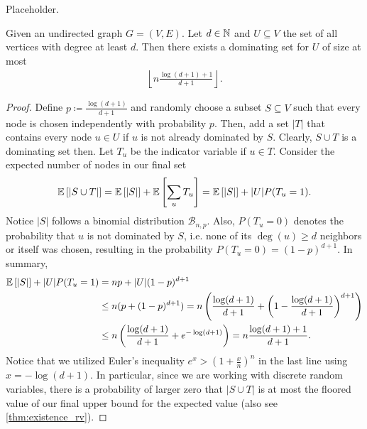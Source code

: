 \begin{aufgabe}
	Placeholder.
\end{aufgabe}
\begin{aufgabe}
	Given an undirected graph $G=(V,E)$.
	Let $d \in \mathbb{N}$ and $U \subseteq V$ the set of all vertices with degree at least $d$.
	Then there exists a dominating set for $U$ of size at most 
	\begin{align*}
		\left\lfloor n \frac{\log(d+1)+1}{d+1} \right\rfloor.
	\end{align*}
	\begin{proof}
		Define $p \coloneqq \frac{\log(d+1)}{d+1}$ and randomly choose a subset $S \subseteq V$
		such that every node is chosen independently with probability $p$.
		Then, add a set $|T|$ that contains every node $u \in U$ if $u$ is not already dominated by $S$.
		Clearly, $S\cup T$ is a dominating set then.
		Let $T_u$ be the indicator variable if $u \in T$.
		Consider the expected number of nodes in our final set
		\begin{align*}
			\mathbb{E}\left[|S \cup T|\right] = \mathbb{E}\left[|S|\right] + \mathbb{E}\left[\sum_u T_u\right] = \mathbb{E}\left[|S|\right] + |U|P(T_u=1).
		\end{align*}
		Notice $|S|$ follows a binomial distribution $\mathcal{B}_{n,p}$.
		Also, $P(T_u=0)$ denotes the probability that $u$ is not dominated by $S$,
		i.e. none of its $\deg(u) \geq d$ neighbors or itself was chosen, resulting in
		the probability $P(T_u=0) = (1-p)^{d+1}$. In summary,
		\begin{align*}
			\mathbb{E}\left[|S|\right] + |U|P(T_u=1) & = np + |U|(1-p)^{d+1}                                                                                          \\
										& \leq n (p + (1-p)^{d+1}) = n \left( \frac{\log(d+1)}{d+1} + \left(1-\frac{\log(d+1)}{d+1}\right)^{d+1} \right) \\
										& \leq n \left( \frac{\log(d+1)}{d+1} + e^{-\log(d+1)} \right) = n \frac{\log(d+1) + 1}{d+1}.                    \\
		\end{align*}
		Notice that we utilized Euler's inequality $e^x > (1+ \frac{x}{n})^n$ in the last line using $x = -\log(d+1)$.
		In particular, since we are working with discrete random variables,
		there is a probability of larger zero that $|S \cup T|$ is at most the floored value of our final upper bound for the expected value (also see \autoref{thm:existence_rv}).
	\end{proof}
\end{aufgabe}
